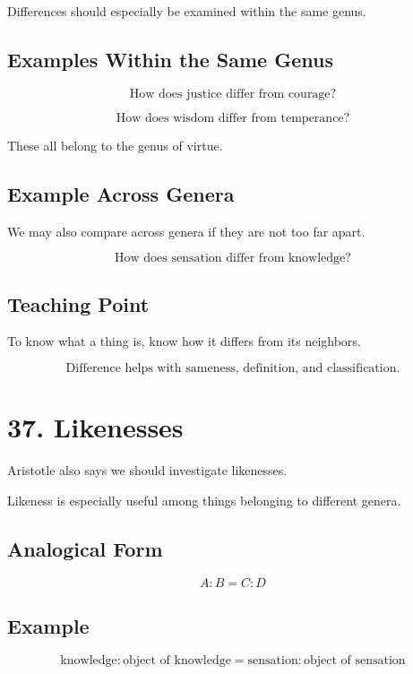 \documentclass[12pt]{article}
\begin{document}
Differences should especially be examined within the same genus.

\subsection*{Examples Within the Same Genus}

\[
\text{How does justice differ from courage?}
\]

\[
\text{How does wisdom differ from temperance?}
\]

These all belong to the genus of virtue.

\subsection*{Example Across Genera}

We may also compare across genera if they are not too far apart.

\[
\text{How does sensation differ from knowledge?}
\]

\subsection*{Teaching Point}

To know what a thing is, know how it differs from its neighbors.

\[
\boxed{
\text{Difference helps with sameness, definition, and classification.}
}
\]

\section*{37. Likenesses}

Aristotle also says we should investigate likenesses.

Likeness is especially useful among things belonging to different genera.

\subsection*{Analogical Form}

\[
A:B = C:D
\]

\subsection*{Example}

\[
\text{knowledge} : \text{object of knowledge}
=
\text{sensation} : \text{object of sensation}
\]
\end{document}
